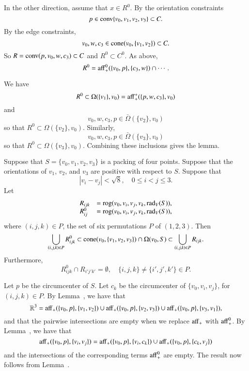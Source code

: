 \begin{tarskidata}
\begin{tarski}
\begin{proved}
In the other direction, assume that $x\in R^0$.
By the orientation constraints
$$
p\in {\operatorname{conv}}\{v_0,v_1,v_2,v_3\}\subset C.
$$
By the edge constraints,
$$
v_0,w,c_3\in {\operatorname{cone}}(v_0,\{v_1,v_2\}) \subset C.
$$
So $R={\operatorname{conv}}(p,v_0,w,c_3) \subset C$ and $R^0\subset C^0$.
As above,
$$
R^0 = {\operatorname{aff}}^0_+(\{v_0,p\},\{c_3,w\}) \cap \cdots.
$$

We have 
$$R^0\subset \Omega(\{v_1\},v_0) = {\operatorname{aff}}_+^+(\{p,w,c_3\},v_0)$$
and $$v_0,w,c_3,p\in \bar\Omega(\{v_2\},v_0)$$ so that $R^0\subset \Omega(\{v_2\},v_0)$.
Similarly, $$v_0,w,c_3,p\in \bar\Omega(\{v_3\},v_0)$$ so that $R^0\subset \Omega(\{v_3\},v_0)$.
Combining these inclusions gives the lemma.
\swallowed\end{proved}
\end{tarski}




\begin{tarski}

\begin{lemma}
Suppose that $S=\{v_0,v_1,v_2,v_3\}$ is a packing
of four points.  Suppose that 
the orientations of $v_1$, $v_2$, and $v_3$ are positive with respect
to $S$.  Suppose that 
  $$
  |v_i - v_j | < \sqrt8, \quad 0\le i < j \le 3.
  $$
Let 
   $$
   \begin{array}{lll}
   R_{ijk} &= {\operatorname{rog}}(v_0,v_i,v_j,v_k,\operatorname{rad}_V(S)),\\
   R^0_{ij} &= {\operatorname{rog}}(v_0,v_i,v_j,v_k,\operatorname{rad}_V(S)),
   \end{array}
   $$
where $(i,j,k)\in P$,  the set of six permutations $P$ of $(1,2,3)$.
Then
   $$
   \bigcup_{(i,j,k)\in P} R_{ijk}^0\subset
   {\operatorname{cone}}(v_0,\{v_1,v_2,v_3\})\cap \Omega(v_0,S) \subset
   \bigcup_{(i,j,k)\in P} R_{ijk}.
   $$
Furthermore,
   $$
   R_{ijk}^0 \cap R_{i'j'k'} =\emptyset,\quad
   \{i,j,k\}\ne\{i',j',k'\}\in P.
   $$
\end{lemma}

\begin{proved} Let $p$ be the circumcenter of $S$.  Let $c_k$
be the circumcenter of $\{v_0,v_i,v_j\}$, for $(i,j,k)\in P$.
By Lemma~, we have that
   $$
   \mathbb{R}^3 = {\operatorname{aff}}_+(\{v_0,p\},\{v_1,v_2\}) \cup
     {\operatorname{aff}}_+(\{v_0,p\},\{v_2,v_3\}) \cup
     {\operatorname{aff}}_+(\{v_0,p\},\{v_3,v_1\}),
   $$
and that the pairwise intersections are empty when we replace
${\operatorname{aff}}_+$ with ${\operatorname{aff}}_+^0$.  By Lemma~,
we have that 
  $$
  {\operatorname{aff}}_+(\{v_0,p\},\{v_i,v_j\}) =
{\operatorname{aff}}_+(\{v_0,p\},\{v_i,c_k\}) \cup
{\operatorname{aff}}_+(\{v_0,p\},\{c_k,v_j\})
  $$
and the intersections of the corresponding terms ${\operatorname{aff}}_+^0$ 
are empty.
The result now follows from Lemma~.
\swallowed\end{proved}
\end{tarski}






\end{tarskidata}
